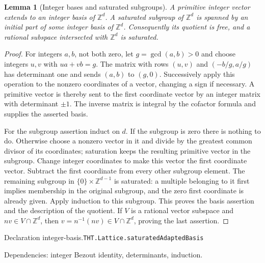 \documentclass[11pt]{article}
\newtheorem{lemma}[theorem]{Lemma}
\theoremstyle{definition}
\newcommand{\Z}{\mathbb Z}
\numberwithin{equation}{section}
\newcommand{\bp}[3]{\par\smallskip\begingroup\footnotesize
\noindent\hypertarget{bp:#1}{\textsf{Declaration #1.}}\quad\nolinkurl{#2}\par
\noindent\textsf{Dependencies:} #3.\par\endgroup\smallskip}
\begin{document}
\begin{lemma}[Integer bases and saturated subgroups]\label{lem:integer-basis}
A primitive integer vector extends to an integer basis of $\Z^d$. A saturated subgroup of $\Z^d$ is spanned by an initial part of some integer basis of $\Z^d$. Consequently its quotient is free, and a rational subspace intersected with $\Z^d$ is saturated.
\end{lemma}
\begin{proof}
For integers $a,b$, not both zero, let $g=\gcd(a,b)>0$ and choose integers $u,v$ with $ua+vb=g$. The matrix with rows $(u,v)$ and $(-b/g,a/g)$ has determinant one and sends $(a,b)$ to $(g,0)$. Successively apply this operation to the nonzero coordinates of a vector, changing a sign if necessary. A primitive vector is thereby sent to the first coordinate vector by an integer matrix with determinant $\pm1$. The inverse matrix is integral by the cofactor formula and supplies the asserted basis.

For the subgroup assertion induct on $d$. If the subgroup is zero there is nothing to do. Otherwise choose a nonzero vector in it and divide by the greatest common divisor of its coordinates; saturation keeps the resulting primitive vector in the subgroup. Change integer coordinates to make this vector the first coordinate vector. Subtract the first coordinate from every other subgroup element. The remaining subgroup in $\{0\}\times\Z^{d-1}$ is saturated: a multiple belonging to it first implies membership in the original subgroup, and the zero first coordinate is already given. Apply induction to this subgroup. This proves the basis assertion and the description of the quotient. If $V$ is a rational vector subspace and $nv\in V\cap\Z^d$, then $v=n^{-1}(nv)\in V\cap\Z^d$, proving the last assertion.
\end{proof}
\bp{integer-basis}{THT.Lattice.saturatedAdaptedBasis}{integer Bezout identity, determinants, induction}
\end{document}
